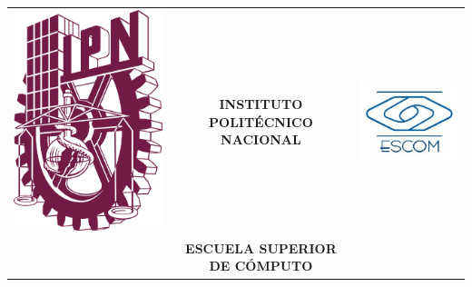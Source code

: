 \begin{titlepage}



\begin{center}
\begin{tabular}{r c l}
\includegraphics[scale=.10]{images/ipn.jpg} & \huge \textbf{INSTITUTO POLITÉCNICO NACIONAL} & \includegraphics[scale=.25]{images/escom.jpg}\\ 
& \Large \textbf{ESCUELA SUPERIOR DE CÓMPUTO}
\end{tabular}
\end{center}



\end{titlepage}
